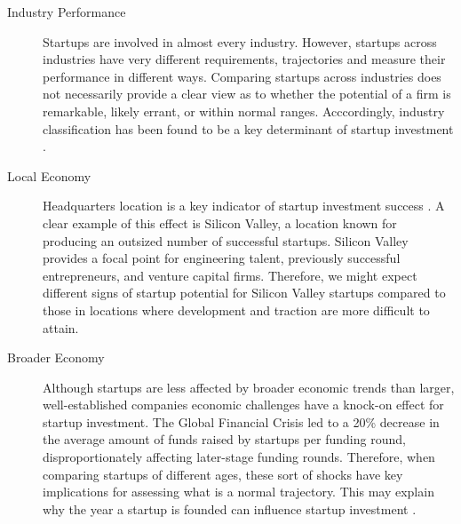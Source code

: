 \begin{description}

\item[Industry Performance]

Startups are involved in almost every industry. However, startups across industries have very different requirements, trajectories and measure their performance in different ways. Comparing startups across industries does not necessarily provide a clear view as to whether the potential of a firm is remarkable, likely errant, or within normal ranges. Acccordingly, industry classification has been found to be a key determinant of startup investment \cite{shan2014,croce2016,gimmon2010}.

\item[Local Economy]

Headquarters location is a key indicator of startup investment success \cite{beckwith2016,croce2016,gimmon2010}. A clear example of this effect is Silicon Valley, a location known for producing an outsized number of successful startups. Silicon Valley provides a focal point for engineering talent, previously successful entrepreneurs, and venture capital firms. Therefore, we might expect different signs of startup potential for Silicon Valley startups compared to those in locations where development and traction are more difficult to attain.

\item[Broader Economy]

Although startups are less affected by broader economic trends than larger, well-established companies economic challenges have a knock-on effect for startup investment. The Global Financial Crisis led to a 20\% decrease in the average amount of funds raised by startups per funding round, disproportionately affecting later-stage funding rounds. Therefore, when comparing startups of different ages, these sort of shocks have key implications for assessing what is a normal trajectory. This may explain why the year a startup is founded can influence startup investment \cite{croce2016,hoenen2014}.

\end{description}
